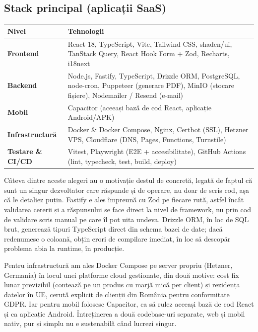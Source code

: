 \documentclass[11pt, a4paper]{article}
\begin{document}
\subsection{Stack principal (aplicații SaaS)}

\renewcommand{\arraystretch}{1.25}
\begin{tabularx}{\textwidth}{>{\bfseries}l X}
\toprule
Nivel & Tehnologii \\
\midrule
Frontend & React 18, TypeScript, Vite, Tailwind CSS, shadcn/ui, TanStack Query, React Hook Form + Zod, Recharts, i18next \\
Backend & Node.js, Fastify, TypeScript, Drizzle ORM, PostgreSQL, node-cron, Puppeteer (generare PDF), MinIO (stocare fișiere), Nodemailer / Resend (e-mail) \\
Mobil & Capacitor (aceeași bază de cod React, aplicație Android/APK) \\
Infrastructură & Docker \& Docker Compose, Nginx, Certbot (SSL), Hetzner VPS, Cloudflare (DNS, Pages, Functions, Turnstile) \\
Testare \& CI/CD & Vitest, Playwright (E2E + accesibilitate), GitHub Actions (lint, typecheck, test, build, deploy) \\
\bottomrule
\end{tabularx}

\vspace{0.8em}
\noindent Câteva dintre aceste alegeri au o motivație destul de concretă, legată de faptul că
sunt un singur dezvoltator care răspunde și de operare, nu doar de scris cod, așa că le detaliez
puțin. Fastify e ales împreună cu Zod pe fiecare rută, astfel încât validarea cererii și a
răspunsului se face direct la nivel de framework, nu prin cod de validare scris manual pe care
îl pot uita undeva. Drizzle ORM, în loc de SQL brut, generează tipuri TypeScript direct din
schema bazei de date; dacă redenumesc o coloană, obțin erori de compilare imediat, în loc să
descopăr problema abia la runtime, în producție.

Pentru infrastructură am ales Docker Compose pe server propriu (Hetzner, Germania) în locul unei
platforme cloud gestionate, din două motive: cost fix lunar previzibil (contează pe un produs cu
marjă mică per client) și rezidența datelor în UE, cerută explicit de clienții din România pentru
conformitate GDPR. Iar pentru mobil folosesc Capacitor, ca să rulez aceeași bază de cod React și
ca aplicație Android. Întreținerea a două codebase-uri separate, web și mobil nativ, pur și
simplu nu e sustenabilă când lucrezi singur.
\end{document}
